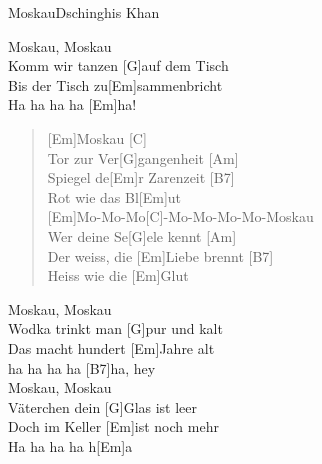 \begin{song}{Moskau}{Dschinghis Khan}
\begin{chorus}
        [Em]Moskau, Moskau \\
        [C]Komm wir tanzen [G]auf dem Tisch \\
        [Am]Bis der Tisch zu[Em]sammenbricht \\
        [B7]Ha ha ha ha [Em]ha!
    \end{chorus}
     
    \begin{verse}
        [Em]Moskau [C] \\
        Tor zur Ver[G]gangenheit [Am] \\
        Spiegel de[Em]r Zarenzeit [B7] \\
        Rot wie das Bl[Em]ut \\

        [Em]Mo-Mo-Mo[C]-Mo-Mo-Mo-Mo-Moskau \\
        Wer deine Se[G]ele kennt [Am] \\
        Der weiss, die [Em]Liebe brennt [B7] \\
        Heiss wie die [Em]Glut
    \end{verse}


    \begin{bridge}
        [Em]Moskau, Moskau \\
        [C]Wodka trinkt man [G]pur und kalt \\
        [Am]Das macht hundert [Em]Jahre alt \\
        [Am]ha ha ha ha [B7]ha, hey \\
        [Em]Moskau, Moskau \\
        [C]Väterchen dein [G]Glas ist leer \\
        [Am]Doch im Keller [Em]ist noch mehr \\
        [B7]Ha ha ha ha h[Em]a
    \end{bridge}
     
    
\end{song}
